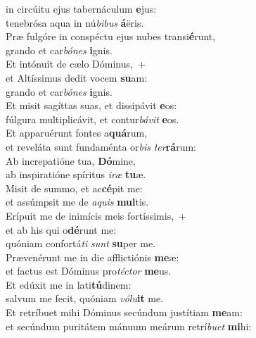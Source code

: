 \oddverse  in circúitu ejus tabernáculum \textbf{e}jus:~\*\\
\oddverse tenebrósa aqua in nú\textit{bi}\textit{bus} \textbf{á}ëris.\\
\evenverse Præ fulgóre in conspéctu ejus nubes transi\textbf{é}runt,~\*\\
\evenverse grando et car\textit{bó}\textit{nes} \textbf{i}gnis.\\
\oddverse Et intónuit de cælo Dóminus,~+\\
\oddverse  et Altíssimus dedit vocem \textbf{su}am:~\*\\
\oddverse grando et car\textit{bó}\textit{nes} \textbf{i}gnis.\\
\evenverse Et misit sagíttas suas, et dissipávit \textbf{e}os:~\*\\
\evenverse fúlgura multiplicávit, et contur\textit{bá}\textit{vit} \textbf{e}os.\\
\oddverse Et apparuérunt fontes a\textbf{quá}rum,~\*\\
\oddverse et reveláta sunt fundaménta or\textit{bis} \textit{ter}\textbf{rá}rum:\\
\evenverse Ab increpatióne tua, \textbf{Dó}mine,~\*\\
\evenverse ab inspiratióne spíritus \textit{i}\textit{ræ} \textbf{tu}æ.\\
\oddverse Misit de summo, et ac\textbf{cé}pit me:~\*\\
\oddverse et assúmpsit me de \textit{a}\textit{quis} \textbf{mul}tis.\\
\evenverse Erípuit me de inimícis meis fortíssimis,~+\\
\evenverse  et ab his qui o\textbf{dé}runt me:~\*\\
\evenverse quóniam confortá\textit{ti} \textit{sunt} \textbf{su}per me.\\
\oddverse Prævenérunt me in die afflictiónis \textbf{me}æ:~\*\\
\oddverse et factus est Dóminus pro\textit{té}\textit{ctor} \textbf{me}us.\\
\evenverse Et edúxit me in lati\textbf{tú}dinem:~\*\\
\evenverse salvum me fecit, quóniam \textit{vó}\textit{lu}\textbf{it} me.\\
\oddverse Et retríbuet mihi Dóminus secúndum justítiam \textbf{me}am:~\*\\
\oddverse et secúndum puritátem mánuum meárum retrí\textit{bu}\textit{et} \textbf{mi}hi:\\

